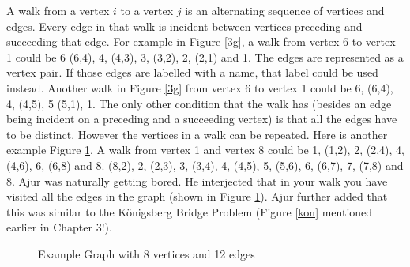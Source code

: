 A walk from a vertex $i$ to a vertex $j$ is an alternating sequence of vertices and edges. Every edge in that walk is incident between vertices preceding and succeeding that edge. For example in Figure \ref{3g},
a walk from vertex 6 to vertex 1 could be 6 (6,4), 4, (4,3), 3, (3,2), 2, (2,1) and 1. The edges are represented as a vertex pair. If those edges are labelled with a name, that label could be used instead. Another walk in Figure \ref{3g} from vertex 6 to vertex 1 could be 6, (6,4), 4, (4,5), 5 (5,1), 1.  The only other condition that the walk has (besides an edge being incident on a preceding and a succeeding vertex) is that all the edges have to be distinct. However the vertices in a walk can be repeated. 
Here is another example Figure \ref{3g3}. A walk from vertex 1 and vertex 8 could be 1, (1,2), 2, (2,4), 4, (4,6), 6, (6,8) and 8. (8,2), 2, (2,3), 3, (3,4), 4, (4,5), 5, (5,6), 6, (6,7), 7, (7,8) and 8. Ajur was naturally getting bored. He interjected that in your walk you have visited all the edges in the graph (shown in Figure \ref{3g3}). Ajur further added that this was similar to the K\"{o}nigsberg Bridge Problem (Figure \ref{kon} mentioned earlier in Chapter 3!).  
\begin{figure}
\begin{center}
\caption{ Example Graph with 8 vertices and 12 edges}\label{3g3}
\end{center}
\end{figure}
\\

